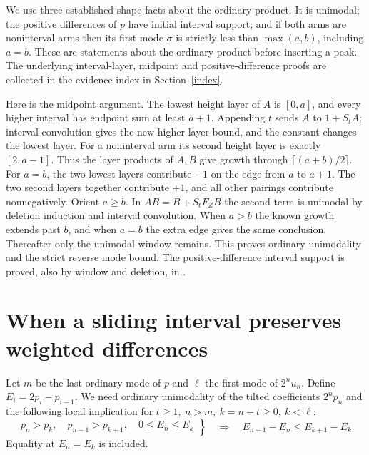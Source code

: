 \documentclass[11pt]{article}
\begin{document}
We use three established shape facts about the ordinary product. It is
unimodal; the positive differences of \(p\) have initial interval
support; and if both arms are noninterval arms then its first mode
\(\sigma\) is strictly less than \(\max(a,b)\), including \(a=b\).
These are statements about the ordinary product before inserting a peak.
The underlying interval-layer, midpoint and positive-difference proofs
are collected in the evidence index in Section~\ref{index}.

Here is the midpoint argument. The lowest height layer of \(A\) is
\([0,a]\), and every higher interval has endpoint sum at least \(a+1\).
Appending \(t\) sends \(A\) to \(1+S_tA\); interval convolution gives
the new higher-layer bound, and the constant changes the lowest layer.
For a noninterval arm its second height layer is exactly \([2,a-1]\).
Thus the layer products of \(A,B\) give growth through
\(\lceil(a+b)/2\rceil\). For \(a=b\), the two lowest layers contribute
\(-1\) on the edge from \(a\) to \(a+1\). The two second layers together
contribute \(+1\), and all other pairings contribute nonnegatively.
Orient \(a\ge b\). In \(AB=B+S_tF_ZB\) the second term is unimodal by
deletion induction and interval convolution. When \(a>b\) the known
growth extends past \(b\), and when \(a=b\) the extra edge gives the
same conclusion. Thereafter only the unimodal window remains.
This proves ordinary unimodality and the strict reverse mode bound.
The positive-difference interval support is proved, also by window
and deletion, in .

\section{When a sliding interval preserves weighted differences}
Let \(m\) be the last ordinary mode of \(p\) and \(\ell\) the first mode
of \(2^nu_n\). Define \(E_i=2p_i-p_{i-1}\).
We need ordinary unimodality of the tilted coefficients \(2^np_n\) and
the following local implication for \(t\ge1,\ n>m,\ k=n-t\ge0,\ k<\ell\):
\begin{equation}
 \left.
 \begin{gathered}
 p_n>p_k,\quad p_{n+1}>p_{k+1},\quad 0\le E_n\le E_k
 \end{gathered}\right\}
 \quad\Longrightarrow\quad
 E_{n+1}-E_n\le E_{k+1}-E_k.                               \label{gap}
\end{equation}
Equality at \(E_n=E_k\) is included.
\end{document}
